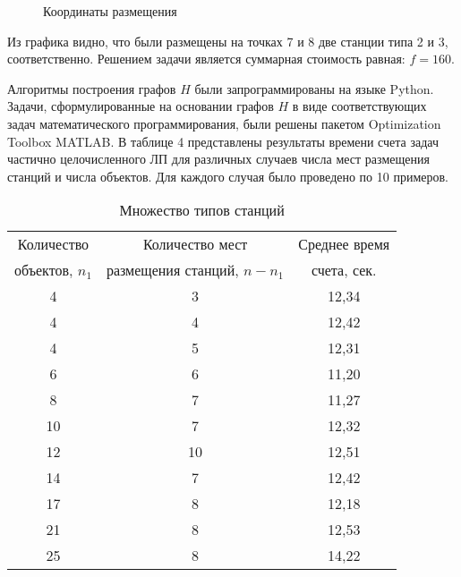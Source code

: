 \begin{figure}[ht]
    \caption{Координаты размещения}\label{fig:part2_solution}
\end{figure}

Из графика видно, что были размещены на точках 7 и 8 две станции типа 2 и 3, соответственно.
Решением задачи является суммарная стоимость равная:
$f=160$.






Алгоритмы построения графов $H$ были запрограммированы на языке Python. Задачи, сформулированные на основании графов $H$ в виде соответствующих задач математического программирования, были решены пакетом Optimization Toolbox MATLAB.
В таблице 4 представлены результаты времени счета задач частично целочисленного ЛП для различных случаев числа мест размещения станций и числа объектов. Для каждого случая было проведено по 10 примеров.

\begin{table}
    \centering
    \captionsetup{justification=centering} %
    \caption{Множество типов станций}\label{tab:part2_station_types}
    \begin{tabular}{|c|c|c|}
        \toprule
        Количество & Количество мест  & Среднее время 
        \tabularnewline объектов, $n_1$ & размещения станций, $n-n_1$ &  счета, сек.  \\
        \toprule
        4   & 3 & 12,34 \\
        4   & 4 & 12,42 \\
        4   & 5 & 12,31 \\
        6   & 6 & 11,20 \\
        8   & 7 & 11,27 \\
        10  & 7 & 12,32 \\
        12  & 10 & 12,51 \\
        14  & 7 & 12,42 \\
        17  & 8 & 12,18 \\
        21  & 8 & 12,53 \\
        25  & 8 & 14,22 \\
        \bottomrule
    \end{tabular}
\end{table}


